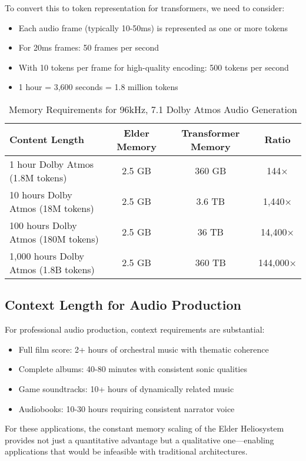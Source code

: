 To convert this to token representation for transformers, we need to consider:
\begin{itemize}
    \item Each audio frame (typically 10-50ms) is represented as one or more tokens
    \item For 20ms frames: 50 frames per second
    \item With 10 tokens per frame for high-quality encoding: 500 tokens per second
    \item 1 hour = 3,600 seconds = 1.8 million tokens
\end{itemize}

\begin{table}[h]
\centering
\begin{tabular}{|l|c|c|c|}
\hline
\textbf{Content Length} & \textbf{Elder Memory} & \textbf{Transformer Memory} & \textbf{Ratio} \\
\hline
1 hour Dolby Atmos (1.8M tokens) & 2.5 GB & 360 GB & 144× \\
10 hours Dolby Atmos (18M tokens) & 2.5 GB & 3.6 TB & 1,440× \\
100 hours Dolby Atmos (180M tokens) & 2.5 GB & 36 TB & 14,400× \\
1,000 hours Dolby Atmos (1.8B tokens) & 2.5 GB & 360 TB & 144,000× \\
\hline
\end{tabular}
\caption{Memory Requirements for 96kHz, 7.1 Dolby Atmos Audio Generation}
\end{table}

\subsection{Context Length for Audio Production}

For professional audio production, context requirements are substantial:
\begin{itemize}
    \item Full film score: 2+ hours of orchestral music with thematic coherence
    \item Complete albums: 40-80 minutes with consistent sonic qualities
    \item Game soundtracks: 10+ hours of dynamically related music
    \item Audiobooks: 10-30 hours requiring consistent narrator voice
\end{itemize}

For these applications, the constant memory scaling of the Elder Heliosystem provides not just a quantitative advantage but a qualitative one—enabling applications that would be infeasible with traditional architectures.

